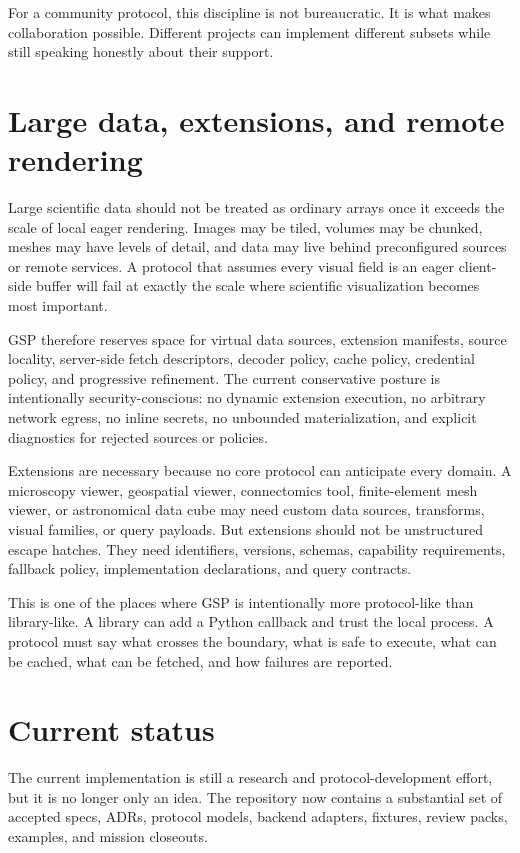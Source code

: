 \documentclass[a4paper,11pt]{article}
\newcommand{\gsp}{GSP\xspace}
\begin{document}
For a community protocol, this discipline is not bureaucratic. It is what makes collaboration
possible. Different projects can implement different subsets while still speaking honestly about
their support.

\section{Large data, extensions, and remote rendering}

Large scientific data should not be treated as ordinary arrays once it exceeds the scale of local
eager rendering. Images may be tiled, volumes may be chunked, meshes may have levels of detail, and
data may live behind preconfigured sources or remote services. A protocol that assumes every visual
field is an eager client-side buffer will fail at exactly the scale where scientific visualization
becomes most important.

\gsp therefore reserves space for virtual data sources, extension manifests, source locality,
server-side fetch descriptors, decoder policy, cache policy, credential policy, and progressive
refinement. The current conservative posture is intentionally security-conscious: no dynamic
extension execution, no arbitrary network egress, no inline secrets, no unbounded materialization,
and explicit diagnostics for rejected sources or policies.

Extensions are necessary because no core protocol can anticipate every domain. A microscopy viewer,
geospatial viewer, connectomics tool, finite-element mesh viewer, or astronomical data cube may need
custom data sources, transforms, visual families, or query payloads. But extensions should not be
unstructured escape hatches. They need identifiers, versions, schemas, capability requirements,
fallback policy, implementation declarations, and query contracts.

This is one of the places where \gsp is intentionally more protocol-like than library-like. A library
can add a Python callback and trust the local process. A protocol must say what crosses the
boundary, what is safe to execute, what can be cached, what can be fetched, and how failures are
reported.

\section{Current status}

The current implementation is still a research and protocol-development effort, but it is no longer
only an idea. The repository now contains a substantial set of accepted specs, ADRs, protocol
models, backend adapters, fixtures, review packs, examples, and mission closeouts.
\end{document}
